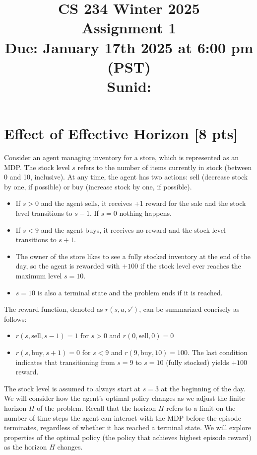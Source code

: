 \documentclass[11pt]{article}
\title{CS 234 Winter 2025 \\ Assignment 1 \\ Due: January 17th 2025 at 6:00 pm (PST) \\
Sunid: 
}
\date{}
\begin{document}
  \maketitle


\section{Effect of Effective Horizon [8 pts]} 

Consider an agent managing inventory for a store, which is represented as an MDP. The stock level $s$ refers to the number of items currently in stock (between 0 and 10, inclusive). At any time, the agent has two actions: sell (decrease stock by one, if possible) or buy (increase stock by one, if possible).  
\begin{itemize}
\item If $s 
 > 0$ and the agent sells, it receives +1 reward for the sale and the stock level transitions to $s - 1$. If $s = 0$ nothing happens.
 \item If $s < 9$ and the agent buys, it receives no reward and the stock level transitions to $s +  1$.
 \item The owner of the store likes to see a fully stocked inventory at the end of the day, so the agent is rewarded with $+100$ if the stock level ever reaches the maximum level $s = 10$.
 \item $s = 10$ is also a terminal state and the problem ends if it is reached.
\end{itemize}

The reward function, denoted as $r(s, a, s')$, can be summarized concisely as follows:
\begin{itemize}
    \item $r(s,\text{sell}, s-1) = 1$ for $s > 0$ and $r(0,\text{sell},0) = 0$
    \item $r(s, \text{buy}, s+1) = 0$ for $s < 9$ and $r(9, \text{buy}, 10) = 100$. The last condition indicates that transitioning from $s = 9$ to $s = 10$ (fully stocked) yields $+100$ reward.
\end{itemize}

\noindent The stock level is assumed to always start at $s = 3$ at the beginning of the day. We will consider how the agent's optimal policy changes as we adjust the finite horizon $H$ of the problem. Recall that the horizon $H$ refers to a limit on the number of time steps the agent can interact with the MDP before the episode terminates, regardless of whether it has reached a terminal state. We will explore properties of the optimal policy (the policy that achieves highest episode reward) as the horizon $H$ changes.\\
\end{document}
